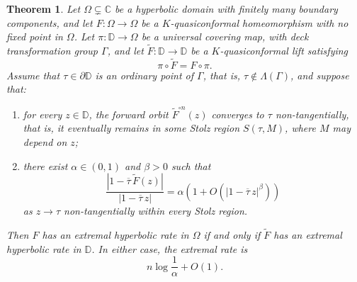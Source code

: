 \documentclass[12pt]{amsart}
\numberwithin{equation}{section}
\theoremstyle{plain}
\newtheorem{theorem}[equation]{Theorem}
\theoremstyle{definition}
\begin{document}
\begin{theorem}
\label{thm:qc_multiply}
Let $\Omega\subsetneq\mathbb{C}$ be a hyperbolic domain with finitely
many boundary components, and let
$F:\Omega\to\Omega$ be a $K$-quasiconformal homeomorphism with no fixed
point in $\Omega$. Let
$\pi:\mathbb{D}\to\Omega$ be a universal covering map, with deck
transformation group $\Gamma$, and let
$\widetilde F:\mathbb{D}\to\mathbb{D}$ be a $K$-quasiconformal lift
satisfying
\begin{equation*}
\pi\circ\widetilde F
=
F\circ\pi.
\end{equation*}
Assume that $\tau\in\partial\mathbb{D}$ is an ordinary point of
$\Gamma$, that is, $\tau\notin\Lambda(\Gamma)$, and suppose that:

\begin{enumerate}
\item[\emph{(i)}]
for every $z\in\mathbb{D}$, the forward orbit
$\widetilde F^{\circ n}(z)$ converges to $\tau$ non-tangentially,
that is, it eventually remains in some Stolz region
$S(\tau,M)$, where $M$ may depend on $z$;

\item[\emph{(ii)}]
there exist $\alpha\in(0,1)$ and $\beta>0$ such that
\begin{equation*}
\label{eq:qc_multiply_boundary}
\frac{|1-\overline{\tau}\,\widetilde F(z)|}
{|1-\overline{\tau}\,z|}
=
\alpha
\left(
1+
O\!\left(
|1-\overline{\tau}\,z|^\beta
\right)
\right)
\end{equation*}
as $z\to\tau$ non-tangentially within every Stolz region.
\end{enumerate}

Then $F$ has an extremal hyperbolic rate in $\Omega$ if and only if
$\widetilde F$ has an extremal hyperbolic rate in $\mathbb{D}$.
In either case, the extremal rate is
\begin{equation*}
n\log\frac{1}{\alpha}+O(1).
\end{equation*}
\end{theorem}
\end{document}
